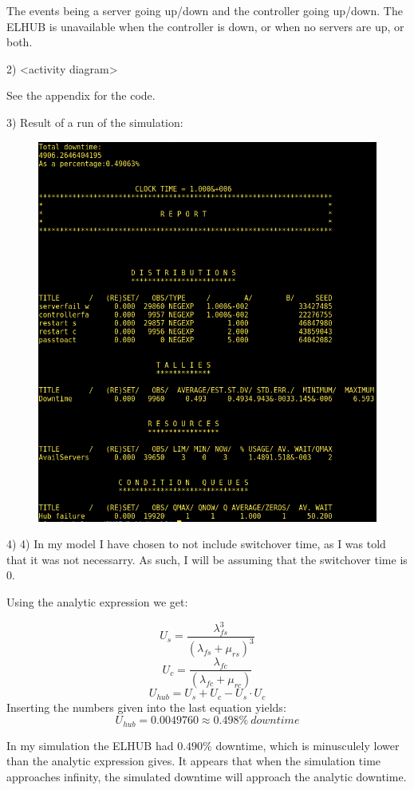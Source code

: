 \documentclass[11pt]{article}
\begin{document}
The events being a server going up/down and the controller going up/down.
The ELHUB is unavailable when the controller is down, or when no servers are up, or both.

2) 
<activity diagram>

See the appendix for the code.


3)
Result of a run of the simulation:

\begin{figure}
	\includegraphics[width=\textwidth]{demos_2.png}
	\centering
\end{figure}

4)
4) In my model I have chosen to not include switchover time, as I was told that it was not necessarry. As such, I will be assuming that the switchover time is 0.

Using the analytic expression we get:

$$U_s = \frac{\lambda_{fs}^3}{(\lambda_{fs} + \mu_{rs})^3}$$
$$U_c = \frac{\lambda_{fc}}{(\lambda_{fc} + \mu_{rc})}$$
$$U_{hub} = U_s + U_c - U_s \cdot U_c$$
Inserting the numbers given into the last equation yields:
$$U_{hub} = 0.0049760 \approx 0.498\%\ downtime$$

In my simulation the ELHUB had $0.490\%$ downtime, which is minusculely lower than the analytic expression gives. It appears that when the simulation time approaches infinity, the simulated downtime will approach the analytic downtime. 
\end{document}
